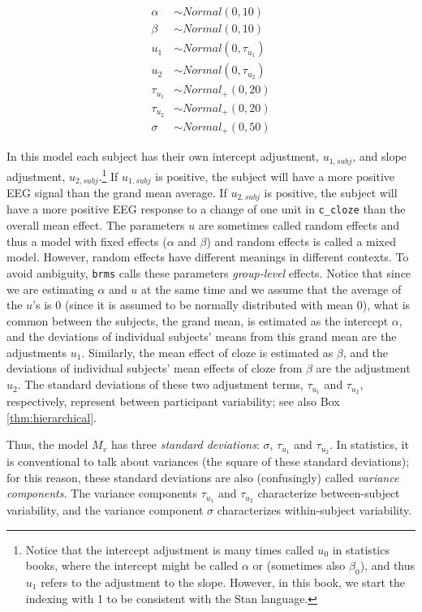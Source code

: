 \documentclass[12pt,]{krantz}
\theoremstyle{definition}
\theoremstyle{definition}
\theoremstyle{definition}
\theoremstyle{remark}
\begin{document}
\begin{equation}
 \begin{aligned}
 \alpha &\sim Normal(0,10)\\
 \beta  &\sim Normal(0,10)\\
 u_1 &\sim Normal(0,\tau_{u_1})\\
 u_2 &\sim Normal(0,\tau_{u_2})\\
 \tau_{u_1} &\sim Normal_+(0,20) \\
 \tau_{u_2} &\sim Normal_+(0,20) \\
 \sigma  &\sim Normal_+(0,50)
 \end{aligned}
 \end{equation}

In this model each subject has their own intercept adjustment,
\(u_{1,subj}\), and slope adjustment, \(u_{2,subj}\).\footnote{Notice
  that the intercept adjustment is many times called \(u_0\) in
  statistics books, where the intercept might be called \(\alpha\) or
  (sometimes also \(\beta_0\)), and thus \(u_1\) refers to the
  adjustment to the slope. However, in this book, we start the indexing
  with 1 to be consistent with the Stan language.} If \(u_{1,subj}\) is
positive, the subject will have a more positive EEG signal than the
grand mean average. If \(u_{2,subj}\) is positive, the subject will have
a more positive EEG response to a change of one unit in
\texttt{c\_cloze} than the overall mean effect. The parameters \(u\) are
sometimes called random effects and thus a model with fixed effects
(\(\alpha\) and \(\beta\)) and random effects is called a mixed model.
However, random effects have different meanings in different contexts.
To avoid ambiguity, \texttt{brms} calls these parameters
\emph{group-level} effects. Notice that since we are estimating
\(\alpha\) and \(u\) at the same time and we assume that the average of
the \(u\)'s is 0 (since it is assumed to be normally distributed with
mean 0), what is common between the subjects, the grand mean, is
estimated as the intercept \(\alpha\), and the deviations of individual
subjects' means from this grand mean are the adjustments \(u_1\).
Similarly, the mean effect of cloze is estimated as \(\beta\), and the
deviations of individual subjects' mean effects of cloze from \(\beta\)
are the adjustment \(u_2\). The standard deviations of these two
adjustment terms, \(\tau_{u_1}\) and \(\tau_{u_2}\), respectively,
represent between participant variability; see also Box
\ref{thm:hierarchical}.

Thus, the model \(M_{v}\) has three \emph{standard deviations}:
\(\sigma\), \(\tau_{u_1}\) and \(\tau_{u_2}\). In statistics, it is
conventional to talk about variances (the square of these standard
deviations); for this reason, these standard deviations are also
(confusingly) called \emph{variance components}. The variance components
\(\tau_{u_1}\) and \(\tau_{u_2}\) characterize between-subject
variability, and the variance component \(\sigma\) characterizes
within-subject variability.
\end{document}
